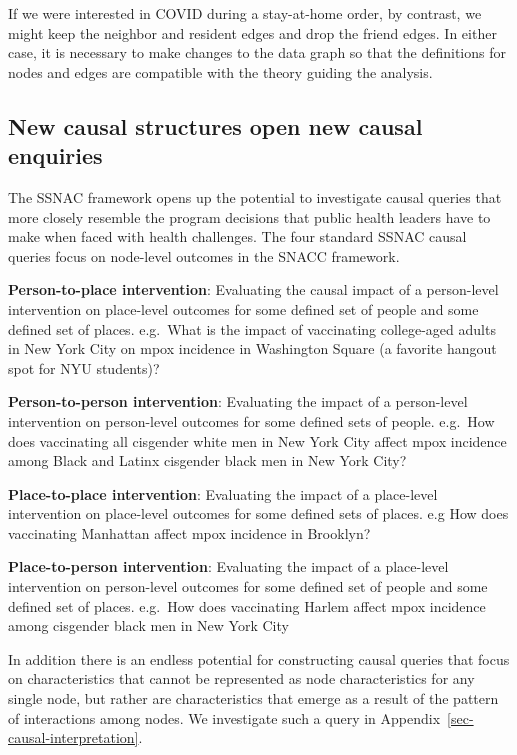 \documentclass[
  letterpaper,
  DIV=11,
  numbers=noendperiod,
  oneside]{scrreprt}
\begin{document}
If we were interested in COVID during a stay-at-home order, by contrast,
we might keep the neighbor and resident edges and drop the friend edges.
In either case, it is necessary to make changes to the data graph so
that the definitions for nodes and edges are compatible with the theory
guiding the analysis.

\hypertarget{new-causal-structures-open-new-causal-enquiries}{%
\subsection*{New causal structures open new causal
enquiries}\label{new-causal-structures-open-new-causal-enquiries}}

The SSNAC framework opens up the potential to investigate causal queries
that more closely resemble the program decisions that public health
leaders have to make when faced with health challenges. The four
standard SSNAC causal queries focus on node-level outcomes in the SNACC
framework.

\textbf{Person-to-place intervention}: Evaluating the causal impact of a
person-level intervention on place-level outcomes for some defined set
of people and some defined set of places. e.g.~What is the impact of
vaccinating college-aged adults in New York City on mpox incidence in
Washington Square (a favorite hangout spot for NYU students)?

\textbf{Person-to-person intervention}: Evaluating the impact of a
person-level intervention on person-level outcomes for some defined sets
of people. e.g.~How does vaccinating all cisgender white men in New York
City affect mpox incidence among Black and Latinx cisgender black men in
New York City?

\textbf{Place-to-place intervention}: Evaluating the impact of a
place-level intervention on place-level outcomes for some defined sets
of places. e.g How does vaccinating Manhattan affect mpox incidence in
Brooklyn?

\textbf{Place-to-person intervention}: Evaluating the impact of a
place-level intervention on person-level outcomes for some defined set
of people and some defined set of places. e.g.~How does vaccinating
Harlem affect mpox incidence among cisgender black men in New York City

In addition there is an endless potential for constructing causal
queries that focus on characteristics that cannot be represented as node
characteristics for any single node, but rather are characteristics that
emerge as a result of the pattern of interactions among nodes. We
investigate such a query in Appendix~\ref{sec-causal-interpretation}.
\end{document}
